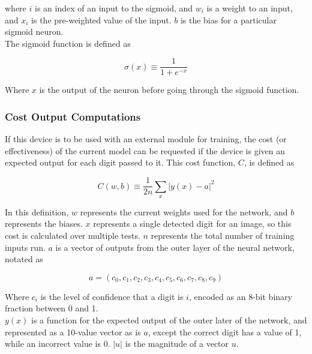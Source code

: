\documentclass[12pt]{article}
\begin{document}
where $i$ is an index of an input to the sigmoid, and $w_i$ is a weight to an input, and $x_i$ is the pre-weighted value of the input. $b$ is the bias for a particular sigmoid neuron.\\

The sigmoid function is defined as

\begin{equation} \label{eq:sigmoid}
\sigma(x) \equiv \frac{1}{1+e^{-x}}
\end{equation}

Where $x$ is the output of the neuron before going through the sigmoid function.

\subsubsection{Cost Output Computations}

If this device is to be used with an external module for training, the cost (or effectiveness) of the current model can be requested if the device is given an expected output for each digit passed to it. This cost function, $C$, is defined\cite{nielsenneural} as

\begin{equation} \label{eq:cost}
C(w,b) \equiv \frac{1}{2n}\sum_x |y(x) - a|^2
\end{equation}

In this definition, $w$ represents the current weights used for the network, and $b$ represents the biases. $x$ represents a single detected digit for an image, so this cost is calculated over multiple tests. $n$ represents the total number of training inputs run. $a$ is a vector of outputs from the outer layer of the neural network, notated as

\begin{equation}\label{eq:output-vector}
a = (c_0,c_1,c_2,c_3,c_4,c_5,c_6,c_7,c_8,c_9)
\end{equation}

Where $c_i$ is the level of confidence that a digit is $i$, encoded as an 8-bit binary fraction between 0 and 1.\\

$y(x)$ is a function for the expected output of the outer later of the network, and represented as a 10-value vector as is $a$, except the correct digit has a value of 1, while an incorrect value is 0. $|u|$ is the magnitude of a vector $u$.
\end{document}
